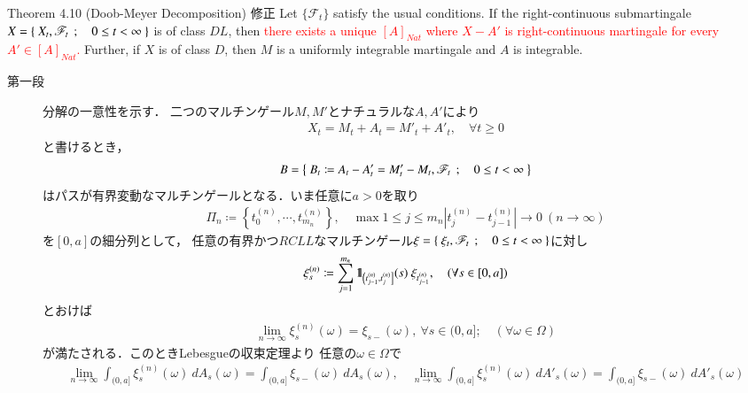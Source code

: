 	\begin{itembox}[l]{Theorem 4.10 (Doob-Meyer Decomposition) 修正}
		Let $\{\mathscr{F}_t\}$ satisfy the usual conditions. If the right-continuous
		submartingale $X = \left\{\ X_t,\mathscr{F}_t\ \, ; \quad 0 \leq t < \infty\ \right\}$ is of class $DL$, then
		\textcolor{red}{there exists a unique $[A]_{Nat}$ where $X - A'$ is right-continuous martingale
		for every $A' \in [A]_{Nat}$.}
		Further, if $X$ is of class $D$, then $M$ is a uniformly integrable martingale 
		and $A$ is integrable.	
	\end{itembox}
	
	\begin{prf}[未修正]\mbox{}
		\begin{description}
			\item[第一段]
				分解の一意性を示す．
				二つのマルチンゲール$M,M'$とナチュラルな$A,A'$により
				\begin{align}
					X_t = M_t + A_t = M'_t + A'_t,
					\quad \forall t \geq 0
				\end{align}
				と書けるとき，
				\begin{align}
					B=\left\{\ B_t \coloneqq A_t - A'_t = M'_t - M_t,\mathscr{F}_t\ \, ; \quad 0 \leq t < \infty\ \right\}
				\end{align}
				はパスが有界変動なマルチンゲールとなる．いま任意に$a > 0$を取り
				\begin{align}
					\Pi_n \coloneqq \left\{t_0^{(n)},\cdots,t_{m_n}^{(n)}\right\},
					\quad \max{1 \leq j \leq m_n}{\left| t_j^{(n)} - t_{j-1}^{(n)}\right|} \longrightarrow 0\ (n \longrightarrow \infty)
				\end{align}
				を$[0,a]$の細分列として，
				任意の有界かつ$RCLL$なマルチンゲール$\xi = \left\{\ \xi_t,\mathscr{F}_t\ \, ; \quad 0 \leq t < \infty\ \right\}$に対し
				\begin{align}
					\xi^{(n)}_s \coloneqq \sum_{j=1}^{m_n} \mbox{1}\hspace{-0.25em}\mbox{l}_{\left(t_{j-1}^{(n)},t_j^{(n)}\right]}(s)\ \xi_{t^{(n)}_{j-1}},
					\quad (\forall s \in [0,a])
				\end{align}
				とおけば
				\begin{align}
					\lim_{n \to \infty} \xi^{(n)}_s(\omega) = \xi_{s-}(\omega),\ \forall s \in (0,a];
					\quad (\forall \omega \in \Omega)
				\end{align}
				が満たされる．このときLebesgueの収束定理より
				任意の$\omega \in \Omega$で
				\begin{align}
					\lim_{n \to \infty} \int_{(0,a]} \xi^{(n)}_s(\omega)\ dA_s(\omega) = \int_{(0,a]} \xi_{s-}(\omega)\ dA_s(\omega),
					\quad \lim_{n \to \infty} \int_{(0,a]} \xi^{(n)}_s(\omega)\ dA'_s(\omega) = \int_{(0,a]} \xi_{s-}(\omega)\ dA'_s(\omega)

\end{align}
\end{description}
\end{prf}
